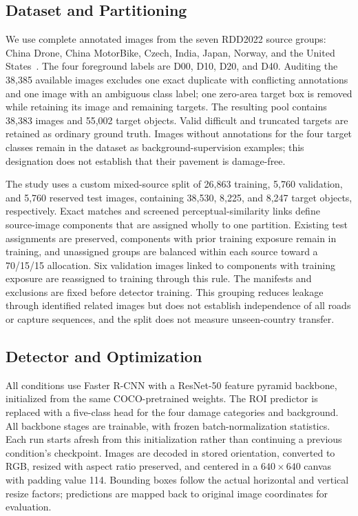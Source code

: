\documentclass[conference]{IEEEtran}
\begin{document}
\subsection{Dataset and Partitioning}
\label{sec:setup_data}
We use complete annotated images from the seven RDD2022 source groups: China Drone, China MotorBike, Czech, India, Japan, Norway, and the United States~\cite{arya2024rdd}. The four foreground labels are D00, D10, D20, and D40. Auditing the 38,385 available images excludes one exact duplicate with conflicting annotations and one image with an ambiguous class label; one zero-area target box is removed while retaining its image and remaining targets. The resulting pool contains 38,383 images and 55,002 target objects. Valid difficult and truncated targets are retained as ordinary ground truth. Images without annotations for the four target classes remain in the dataset as background-supervision examples; this designation does not establish that their pavement is damage-free.

The study uses a custom mixed-source split of 26,863 training, 5,760 validation, and 5,760 reserved test images, containing 38,530, 8,225, and 8,247 target objects, respectively. Exact matches and screened perceptual-similarity links define source-image components that are assigned wholly to one partition. Existing test assignments are preserved, components with prior training exposure remain in training, and unassigned groups are balanced within each source toward a 70/15/15 allocation. Six validation images linked to components with training exposure are reassigned to training through this rule. The manifests and exclusions are fixed before detector training. This grouping reduces leakage through identified related images but does not establish independence of all roads or capture sequences, and the split does not measure unseen-country transfer.

\subsection{Detector and Optimization}
\label{sec:setup_detector}
All conditions use Faster R-CNN with a ResNet-50 feature pyramid backbone, initialized from the same COCO-pretrained weights. The ROI predictor is replaced with a five-class head for the four damage categories and background. All backbone stages are trainable, with frozen batch-normalization statistics. Each run starts afresh from this initialization rather than continuing a previous condition's checkpoint. Images are decoded in stored orientation, converted to RGB, resized with aspect ratio preserved, and centered in a $640\times640$ canvas with padding value 114. Bounding boxes follow the actual horizontal and vertical resize factors; predictions are mapped back to original image coordinates for evaluation.
\end{document}
